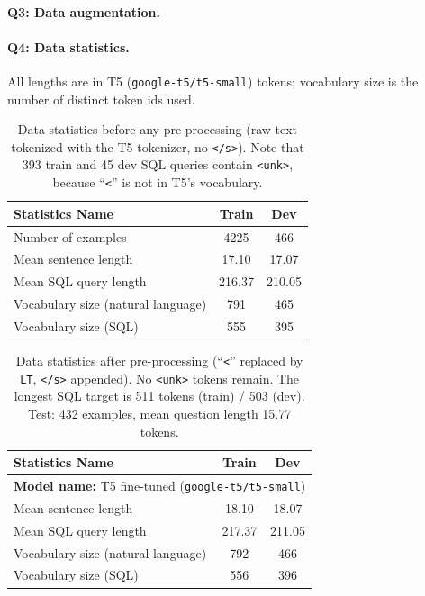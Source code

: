 \paragraph{Q3: Data augmentation.}

\paragraph{Q4: Data statistics.} All lengths are in T5 (\texttt{google-t5/t5-small})
tokens; vocabulary size is the number of distinct token ids used.

\begin{table}[h]
\centering
\begin{tabular}{lcc}
\toprule
Statistics Name & Train & Dev \\
\midrule
Number of examples & 4225 & 466 \\
Mean sentence length & 17.10 & 17.07 \\
Mean SQL query length & 216.37 & 210.05 \\
Vocabulary size (natural language) & 791 & 465 \\
Vocabulary size (SQL) & 555 & 395 \\
\bottomrule
\end{tabular}
\caption{Data statistics before any pre-processing (raw text tokenized with the T5
tokenizer, no \texttt{</s>}). Note that 393 train and 45 dev SQL queries contain
\texttt{<unk>}, because ``\texttt{<}'' is not in T5's vocabulary.}
\end{table}

\begin{table}[h]
\centering
\begin{tabular}{lcc}
\toprule
Statistics Name & Train & Dev \\
\midrule
\multicolumn{3}{l}{\textbf{Model name:} T5 fine-tuned (\texttt{google-t5/t5-small})} \\
Mean sentence length & 18.10 & 18.07 \\
Mean SQL query length & 217.37 & 211.05 \\
Vocabulary size (natural language) & 792 & 466 \\
Vocabulary size (SQL) & 556 & 396 \\
\bottomrule
\end{tabular}
\caption{Data statistics after pre-processing (``\texttt{<}'' replaced by
\texttt{LT}, \texttt{</s>} appended). No \texttt{<unk>} tokens remain. The longest SQL
target is 511 tokens (train) / 503 (dev). Test: 432 examples, mean question length
15.77 tokens.}
\end{table}

